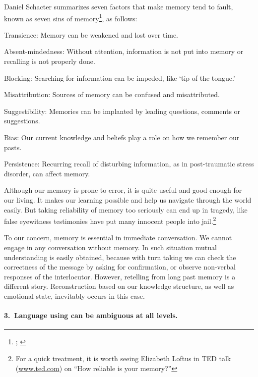 Daniel Schacter summarizes seven factors that make memory tend to fault, known as seven sins of memory\footnote{\citealp{schacter:seven}; \citealp[p.~82]{foster:memory}}, as follows:

\begin{compactenum}[(1)]
\item{Transience: Memory can be weakened and lost over time.}
\item{Absent-mindedness: Without attention, information is not put into memory or recalling is not properly done.}
\item{Blocking: Searching for information can be impeded, like `tip of the tongue.'}
\item{Misattribution: Sources of memory can be confused and misattributed.}
\item{Suggestibility: Memories can be implanted by leading questions, comments or suggestions.}
\item{Bias: Our current knowledge and beliefs play a role on how we remember our pasts.}
\item{Persistence: Recurring recall of disturbing information, as in post-traumatic stress disorder, can affect memory.}
\end{compactenum}

Although our memory is prone to error, it is quite useful and good enough for our living. It makes our learning possible and help us navigate through the world easily. But taking reliability of memory too seriously can end up in tragedy, like false eyewitness testimonies have put many innocent people into jail.\footnote{For a quick treatment, it is worth seeing Elizabeth Loftus in TED talk (\url{www.ted.com}) on ``How reliable is your memory?''}

To our concern, memory is essential in immediate conversation. We cannot engage in any conversation without memory. In such situation mutual understanding is easily obtained, because with turn taking we can check the correctness of the message by asking for confirmation, or observe non-verbal responses of the interlocutor. However, retelling from long past memory is a different story. Reconstruction based on our knowledge structure, as well as emotional state, inevitably occurs in this case.

\paragraph*{3.\ Language using can be ambiguous at all levels.}

